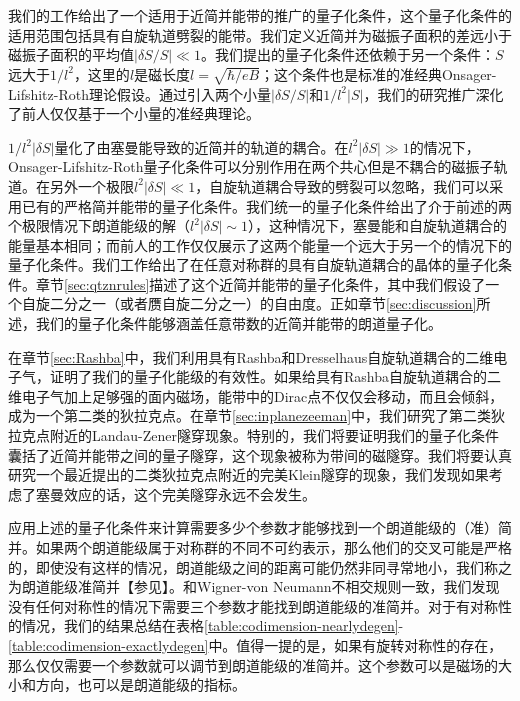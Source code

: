 我们的工作给出了一个适用于近简并能带的推广的量子化条件，这个量子化条件的适用范围包括具有自旋轨道劈裂的能带。我们定义近简并为磁振子面积的差远小于磁振子面积的平均值$|\delta S/S|{\ll}1$。我们提出的量子化条件还依赖于另一个条件：$S$远大于$1/l^2$，这里的$l$是磁长度$l{=}\sqrt{\hbar/eB}$；这个条件也是标准的准经典Onsager-Lifshitz-Roth理论假设。通过引入两个小量$|\delta S/S|$和$1/l^2|S|$，我们的研究推广深化了前人仅仅基于一个小量的准经典理论\cite{kohn_effham,blount_effham,rotheffham,wannier_fredkin,fischbeck_review,Mikitik_quantizationrule,topoferm,100p,gao_zero-field_2017}。

$1/l^2|\delta S|$量化了由塞曼能导致的近简并的轨道的耦合。在$l^2|\delta S|{\gg}1$的情况下，Onsager-Lifshitz{-Roth}量子化条件可以分别作用在两个共心但是不耦合的磁振子轨道。在另外一个极限$l^2|\delta S|{\ll}1$，自旋轨道耦合导致的劈裂可以忽略，我们可以采用已有的严格简并能带的量子化条件\cite{rotheffham,rothmag,topoferm,100p,Mikitik_quantizationrule}。我们统一的量子化条件给出了介于前述的两个极限情况下朗道能级的解（$l^2|\delta S|{\sim}1$），这种情况下，塞曼能和自旋轨道耦合的能量基本相同；而前人的工作仅仅展示了这两个能量一个远大于另一个的情况下的量子化条件。我们工作给出了在任意对称群的具有自旋轨道耦合的晶体的量子化条件。章节\ref{sec:qtznrules}描述了这个近简并能带的量子化条件，其中我们假设了一个自旋二分之一（或者赝自旋二分之一）的自由度。正如章节\ref{sec:discussion}所述，我们的量子化条件能够涵盖任意带数的近简并能带的朗道量子化。


在章节\ref{sec:Rashba}中，我们利用具有Rashba和Dresselhaus自旋轨道耦合的二维电子气，证明了我们的量子化能级的有效性。如果给具有Rashba自旋轨道耦合的二维电子气加上足够强的面内磁场，能带中的Dirac点不仅仅会移动，而且会倾斜，成为一个第二类的狄拉克点\cite{soluyanov_type-ii_2015, muechler_tilted_2016, bergholtz_topology_2015}。在章节\ref{sec:inplanezeeman}中，我们研究了第二类狄拉克点附近的Landau-Zener隧穿现象。特别的，我们将要证明我们的量子化条件囊括了近简并能带之间的量子隧穿，这个现象被称为带间的磁隧穿\cite{kaganov_coherent_1983,slutskin_dynamics_1968,AALG,100p}。我们将要认真研究一个最近提出的二类狄拉克点附近的完美Klein隧穿的现象\cite{obrien_magnetic_2016}，我们发现如果考虑了塞曼效应的话，这个完美隧穿永远不会发生。

应用上述的量子化条件来计算需要多少个参数才能够找到一个朗道能级的（准）简并。如果两个朗道能级属于对称群的不同不可约表示，那么他们的交叉可能是严格的，即使没有这样的情况，朗道能级之间的距离可能仍然非同寻常地小，我们称之为朗道能级准简并【参见】。和Wigner-von Neumann不相交规则\cite{neumann2000behaviour}一致，我们发现没有任何对称性的情况下需要三个参数才能找到朗道能级的准简并。对于有对称性的情况，我们的结果总结在表格\ref{table:codimension-nearlydegen}-\ref{table:codimension-exactlydegen}中。值得一提的是，如果有旋转对称性的存在，那么仅仅需要一个参数就可以调节到朗道能级的准简并。这个参数可以是磁场的大小和方向，也可以是朗道能级的指标。

